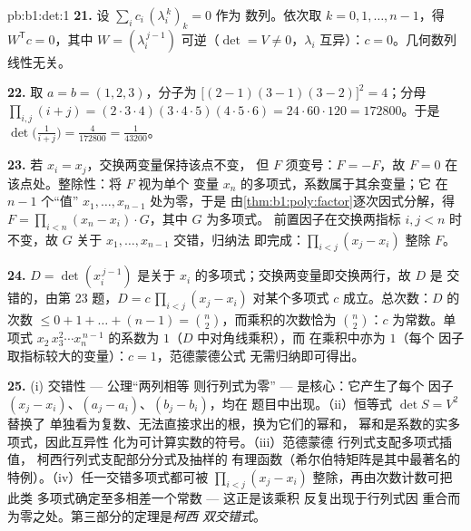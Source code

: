 \begin{solution}{pb:b1:det:1}
\textbf{21.} 设 $\sum_i c_i\,(\lambda_i^{\,k})_{k} = 0$ 作为
数列。依次取 $k = 0, 1, \dots, n-1$，得 $W^{\mathsf
T}c = 0$，其中 $W = (\lambda_i^{\,j-1})$ 可逆（$\det = V
\neq 0$，$\lambda_i$ 互异）：$c = 0$。几何数列
线性无关。

\textbf{22.} 取 $a = b = (1, 2, 3)$，分子为 $\bigl[(2-1)(3-1)
(3-2)\bigr]^2 = 4$；分母 $\prod_{i,j}(i + j) =
(2\cdot3\cdot4)(3\cdot4\cdot5)(4\cdot5\cdot6) = 24\cdot60\cdot120
= 172800$。于是 $\det\bigl(\frac1{i+j}\bigr) = \frac{4}{172800}
= \frac1{43200}$。

\textbf{23.} 若 $x_i = x_j$，交换两变量保持该点不变，
但 $F$ 须变号：$F = -F$，故 $F = 0$
在该点处。整除性：将 $F$ 视为单个
变量 $x_n$ 的多项式，系数属于其余变量；它
在 $n - 1$ 个“值” $x_1, \dots, x_{n-1}$ 处为零，于是
由\cref{thm:b1:poly:factor}逐次因式分解，得 $F =
\prod_{i<n}(x_n - x_i)\cdot G$，其中 $G$ 为多项式。
前置因子在交换两指标 $i, j < n$ 时不变，故
$G$ 关于 $x_1, \dots, x_{n-1}$ 交错，归纳法
即完成：$\prod_{i<j}(x_j - x_i)$ 整除 $F$。

\textbf{24.} $D = \det(x_i^{\,j-1})$ 是关于
$x_i$ 的多项式；交换两变量即交换两行，故 $D$ 是
交错的，由第 23 题，$D = c\,\prod_{i<j}(x_j - x_i)$
对某个多项式 $c$ 成立。总次数：$D$ 的次数 $\leq 0 +
1 + \dots + (n-1) = \binom n2$，而乘积的次数恰为
$\binom n2$：$c$ 为常数。单项式 $x_2\,x_3^2\cdots
x_n^{\,n-1}$ 的系数为 $1$（$D$ 中对角线乘积），而
在乘积中亦为 $1$（每个
因子取指标较大的变量）：$c = 1$，范德蒙德公式
无需归纳即可得出。

\textbf{25.} (i) 交错性 --- 公理“两列相等
则行列式为零” --- 是核心：它产生了每个
因子 $(x_j - x_i)$、$(a_j - a_i)$、$(b_j - b_i)$，均在
题目中出现。（ii）恒等式 $\det S = V^2$ 替换了
单独看为复数、无法直接求出的根，换为它们的幂和，
幂和是系数的实多项式，因此互异性
化为可计算实数的符号。（iii）范德蒙德
行列式支配多项式插值，
柯西行列式支配部分分式及抽样的
有理函数（希尔伯特矩阵是其中最著名的
特例）。（iv）任一交错多项式都可被
$\prod_{i<j}(x_j - x_i)$ 整除，再由次数计数可把此类
多项式确定至多相差一个常数 --- 这正是该乘积
反复出现于行列式因
重合而为零之处。第三部分的定理是\emph{柯西
双交错式}。
\end{solution}
